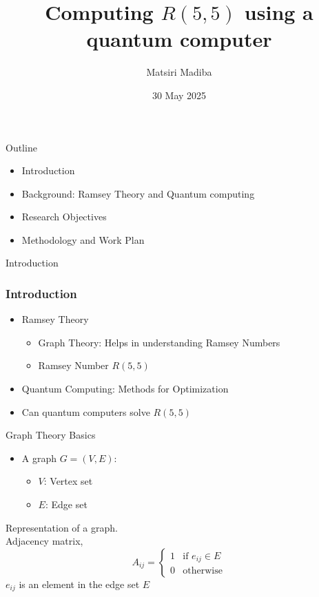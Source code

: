 \documentclass{beamer}
\institute{Wits University}
\title{\texorpdfstring{Computing $R(5,5)$ using a quantum computer}{Computing R(5,5) using a quantum computer}}
\author[A. Name]{Matsiri Madiba}
\date{30 May 2025}
\begin{document}
	\begin{frame}
		\titlepage
	\end{frame}
\begin{frame}{Outline}
	\begin{itemize}
		\item Introduction
		\item Background: Ramsey Theory and Quantum computing
		\item Research Objectives
		\item Methodology and Work Plan
	\end{itemize}
\end{frame}

\begin{frame}{Introduction}
	\frametitle{Introduction}
\begin{itemize}
			\item Ramsey Theory
	\begin{itemize}
		\item Graph Theory: Helps in understanding Ramsey Numbers \pause
		\item Ramsey Number \( R(5,5) \) \pause
	\end{itemize}
	\item Quantum Computing: Methods for Optimization \pause
	\item Can quantum computers solve \(R(5,5)\) \pause



	\end{itemize}
\end{frame}	
\begin{frame}{Graph Theory Basics}
	\begin{itemize}
		\item A graph \( G = (V, E) \):
		\begin{itemize}
			\item \( V \): Vertex set 
			\item \( E \): Edge set 
		\end{itemize}
	\end{itemize}
	 Representation of a graph.\\
	 
	Adjacency matrix,
		$$A_{ij}=\begin{cases} 
			1 & \text{if } e_{ij} \in E \\ 
			0 & \text{otherwise}
		\end{cases}$$
		$e_{ij}$ is an element in the edge set $E$
	
\end{frame}
\end{document}
